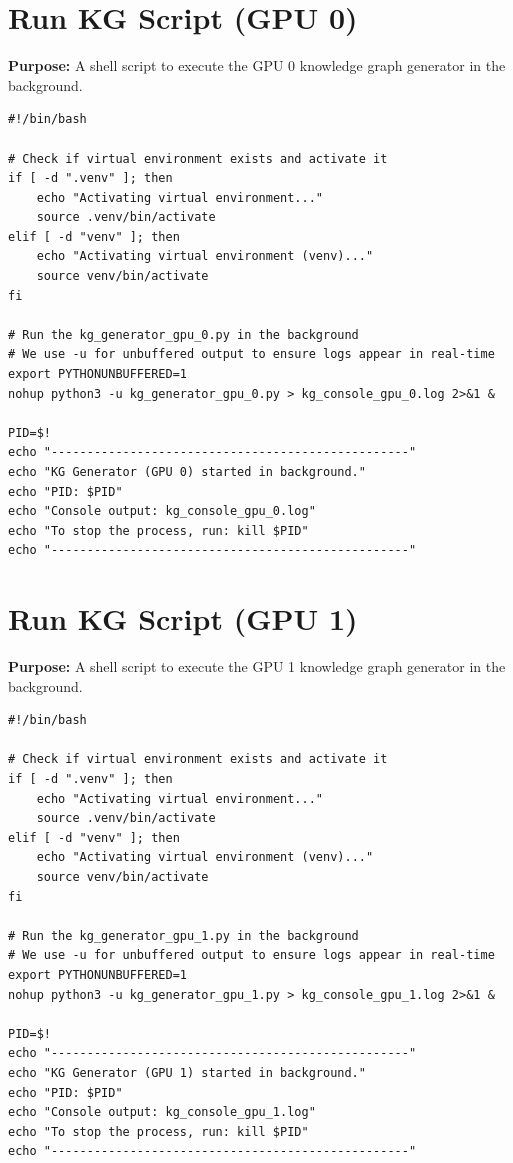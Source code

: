 \documentclass[11pt]{article}
\begin{document}
\section{Run KG Script (GPU 0)} \label{sec:runkg0}
\textbf{Purpose:} A shell script to execute the GPU 0 knowledge graph generator in the background.

\begin{lstlisting}[style=bashcode, caption={run\_kg\_gpu\_0.sh}]
#!/bin/bash

# Check if virtual environment exists and activate it
if [ -d ".venv" ]; then
    echo "Activating virtual environment..."
    source .venv/bin/activate
elif [ -d "venv" ]; then
    echo "Activating virtual environment (venv)..."
    source venv/bin/activate
fi

# Run the kg_generator_gpu_0.py in the background
# We use -u for unbuffered output to ensure logs appear in real-time
export PYTHONUNBUFFERED=1
nohup python3 -u kg_generator_gpu_0.py > kg_console_gpu_0.log 2>&1 &

PID=$!
echo "--------------------------------------------------"
echo "KG Generator (GPU 0) started in background."
echo "PID: $PID"
echo "Console output: kg_console_gpu_0.log"
echo "To stop the process, run: kill $PID"
echo "--------------------------------------------------"
\end{lstlisting}

\section{Run KG Script (GPU 1)} \label{sec:runkg1}
\textbf{Purpose:} A shell script to execute the GPU 1 knowledge graph generator in the background.

\begin{lstlisting}[style=bashcode, caption={run\_kg\_gpu\_1.sh}]
#!/bin/bash

# Check if virtual environment exists and activate it
if [ -d ".venv" ]; then
    echo "Activating virtual environment..."
    source .venv/bin/activate
elif [ -d "venv" ]; then
    echo "Activating virtual environment (venv)..."
    source venv/bin/activate
fi

# Run the kg_generator_gpu_1.py in the background
# We use -u for unbuffered output to ensure logs appear in real-time
export PYTHONUNBUFFERED=1
nohup python3 -u kg_generator_gpu_1.py > kg_console_gpu_1.log 2>&1 &

PID=$!
echo "--------------------------------------------------"
echo "KG Generator (GPU 1) started in background."
echo "PID: $PID"
echo "Console output: kg_console_gpu_1.log"
echo "To stop the process, run: kill $PID"
echo "--------------------------------------------------"
\end{lstlisting}
\end{document}

